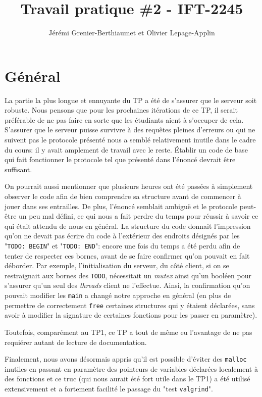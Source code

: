 \documentclass[11pt]{article}
\title{Travail pratique \#2 - IFT-2245}
\author{Jérémi Grenier-Berthiaumet et Olivier Lepage-Applin}
\begin{document}
\maketitle

\section{Général}

La partie la plus longue et ennuyante du TP a été de s'assurer que le serveur soit robuste. Nous pensons que pour les prochaines itérations de ce TP, il serait préférable de ne pas faire en sorte que les étudiants aient à s'occuper de cela. S'assurer que le serveur puisse survivre à des requêtes pleines d'erreurs ou qui ne suivent pas le protocole présenté nous a semblé relativement inutile dans le cadre du cours: il y avait amplement de travail avec le reste. Établir un code de base qui fait fonctionner le protocole tel que présenté dans l'énoncé devrait être suffisant.

On pourrait aussi mentionner que plusieurs heures ont été passées à simplement observer le code afin de bien comprendre sa structure avant de commencer à jouer dans ses entrailles. De plus, l'énoncé semblait ambiguë et le protocole peut-être un peu mal défini, ce qui nous a fait perdre du temps pour réussir à savoir ce qui était attendu de nous en général. La structure du code donnait l'impression qu'on ne devait pas écrire du code à l'extérieur des endroits désignés par les "\texttt{TODO: BEGIN}" et "\texttt{TODO: END}": encore une fois du temps a été perdu afin de tenter de respecter ces bornes, avant de se faire confirmer qu'on pouvait en fait déborder. Par exemple, l'initialisation du serveur, du côté client, si on se restraignait aux bornes des \texttt{TODO}, nécessitait un \textit{mutex} ainsi qu'un booléen pour s'assurer qu'un seul des \textit{threads} client ne l'effectue. Ainsi, la confirmation qu'on pouvait modifier les \texttt{main} a changé notre approche en général (en plus de permettre de correctement \texttt{free} certaines structures qui y étaient déclarées, sans avoir à modifier la signature de certaines fonctions pour les passer en paramètre).

Toutefois, comparément au TP1, ce TP a tout de même eu l'avantage de ne pas requiérer autant de lecture de documentation. 

Finalement, nous avons désormais appris qu'il est possible d'éviter des \texttt{malloc} inutiles en passant en paramètre des pointeurs de variables déclarées localement à des fonctions et ce truc (qui nous aurait été fort utile dans le TP1) a été utilisé extensivement et a fortement facilité le passage du "test \texttt{valgrind}".
\end{document}
